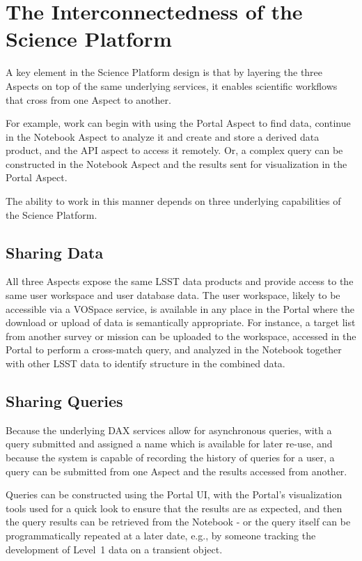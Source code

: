 \section{The Interconnectedness of the Science Platform}\label{interconnectedness-of-the-science-platform}

A key element in the Science Platform design is that by layering the three Aspects on top of the same underlying services, it enables scientific workflows that cross from one Aspect to another.

For example, work can begin with using the Portal Aspect to find data, continue in the Notebook Aspect to analyze it and create and store a derived data product, and the API aspect to access it remotely.
Or, a complex query can be constructed in the Notebook Aspect and the results sent for visualization in the Portal Aspect.

The ability to work in this manner depends on three underlying capabilities of the Science Platform.

\subsection{Sharing Data}\label{sharing-data}

All three Aspects expose the same LSST data products and provide access to the same user workspace and user database data.
The user workspace, likely to be accessible via a VOSpace service, is available in any place in the Portal where the download or upload of data is semantically appropriate.
For instance, a target list from another survey or mission can be uploaded to the workspace, accessed in the Portal to perform a cross-match query, and analyzed in the Notebook together with other LSST data to identify structure in the combined data.

\subsection{Sharing Queries}\label{sharing-queries}

Because the underlying DAX services allow for asynchronous queries, with a query submitted and assigned a name which is available for later re-use, and because the system is capable of recording the history of queries for a user, a query can be submitted from one Aspect and the results accessed from another.

Queries can be constructed using the Portal UI, with the Portal's visualization tools used for a quick look to ensure that the results are as expected, and then the query results can be retrieved from the Notebook - or the query itself can be programmatically repeated at a later date, e.g., by someone tracking the development of Level~1 data on a transient object.

